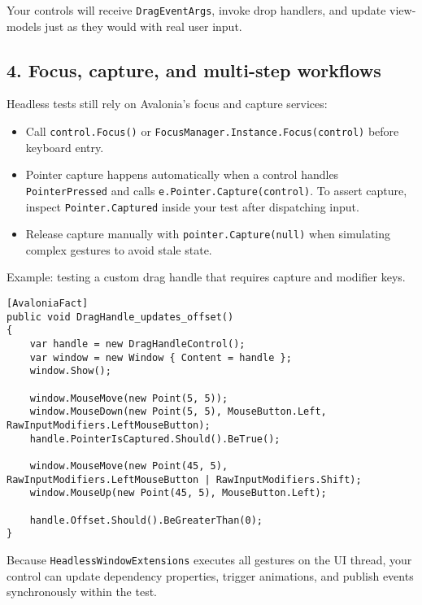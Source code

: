 Your controls will receive \passthrough{\lstinline!DragEventArgs!},
invoke drop handlers, and update view-models just as they would with
real user input.

\subsection{4. Focus, capture, and multi-step
workflows}\label{focus-capture-and-multi-step-workflows}

Headless tests still rely on Avalonia's focus and capture services:

\begin{itemize}
\tightlist
\item
  Call \passthrough{\lstinline!control.Focus()!} or
  \passthrough{\lstinline!FocusManager.Instance.Focus(control)!} before
  keyboard entry.
\item
  Pointer capture happens automatically when a control handles
  \passthrough{\lstinline!PointerPressed!} and calls
  \passthrough{\lstinline!e.Pointer.Capture(control)!}. To assert
  capture, inspect \passthrough{\lstinline!Pointer.Captured!} inside
  your test after dispatching input.
\item
  Release capture manually with
  \passthrough{\lstinline!pointer.Capture(null)!} when simulating
  complex gestures to avoid stale state.
\end{itemize}

Example: testing a custom drag handle that requires capture and modifier
keys.

\begin{lstlisting}
[AvaloniaFact]
public void DragHandle_updates_offset()
{
    var handle = new DragHandleControl();
    var window = new Window { Content = handle };
    window.Show();

    window.MouseMove(new Point(5, 5));
    window.MouseDown(new Point(5, 5), MouseButton.Left, RawInputModifiers.LeftMouseButton);
    handle.PointerIsCaptured.Should().BeTrue();

    window.MouseMove(new Point(45, 5), RawInputModifiers.LeftMouseButton | RawInputModifiers.Shift);
    window.MouseUp(new Point(45, 5), MouseButton.Left);

    handle.Offset.Should().BeGreaterThan(0);
}
\end{lstlisting}

Because \passthrough{\lstinline!HeadlessWindowExtensions!} executes all
gestures on the UI thread, your control can update dependency
properties, trigger animations, and publish events synchronously within
the test.


